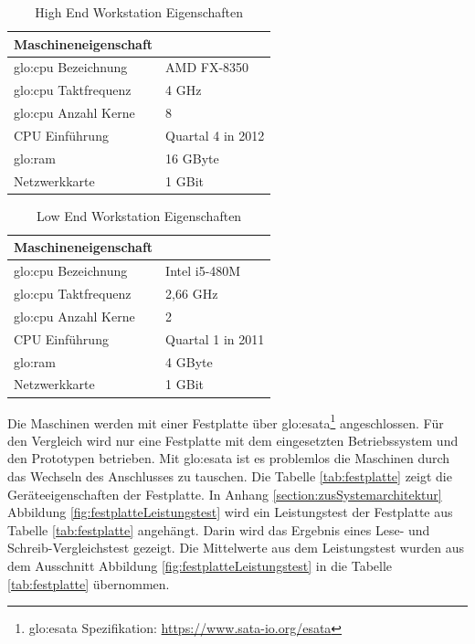 \begin{table}[ht]
	\centering
		\begin{tabular}{@{}ll@{}} \toprule
			\textbf{Maschineneigenschaft} &  \\ \midrule
			\gls{glo:cpu} Bezeichnung & AMD FX-8350 \\
			\gls{glo:cpu} Taktfrequenz & 4 GHz \\
			\gls{glo:cpu} Anzahl Kerne & 8 \\
			CPU Einführung & Quartal 4 in 2012 \\
			\gls{glo:ram} & 16 GByte \\
			Netzwerkkarte & 1 GBit \\
			\bottomrule			
		\end{tabular}
	\caption{High End Workstation Eigenschaften}
	\label{tab:hiendwork}
\end{table}

\begin{table}[ht]
	\centering
		\begin{tabular}{@{}ll@{}} \toprule
			\textbf{Maschineneigenschaft} &  \\ \midrule
			\gls{glo:cpu} Bezeichnung & Intel i5-480M \\
			\gls{glo:cpu} Taktfrequenz & 2,66 GHz \\
			\gls{glo:cpu} Anzahl Kerne & 2 \\
			CPU Einführung & Quartal 1 in 2011 \\
			\gls{glo:ram} & 4 GByte \\
			Netzwerkkarte & 1 GBit \\
			\bottomrule			
		\end{tabular}
	\caption{Low End Workstation Eigenschaften}
	\label{tab:loendwork}
\end{table}

Die Maschinen werden mit einer Festplatte über \gls{glo:esata}\footnote{\gls{glo:esata} Spezifikation: \url{https://www.sata-io.org/esata}} angeschlossen. Für den Vergleich wird nur eine Festplatte mit dem eingesetzten Betriebssystem und den Prototypen betrieben. Mit \gls{glo:esata} ist es problemlos die Maschinen durch das Wechseln des Anschlusses zu tauschen. Die Tabelle \ref{tab:festplatte} zeigt die Geräteeigenschaften der Festplatte. In Anhang \ref{section:zusSystemarchitektur} Abbildung \ref{fig:festplatteLeistungstest} wird ein Leistungstest der Festplatte aus Tabelle \ref{tab:festplatte} angehängt. Darin wird das Ergebnis eines Lese- und Schreib-Vergleichstest gezeigt. Die Mittelwerte aus dem Leistungstest wurden aus dem Ausschnitt Abbildung \ref{fig:festplatteLeistungstest} in die Tabelle \ref{tab:festplatte} übernommen.

